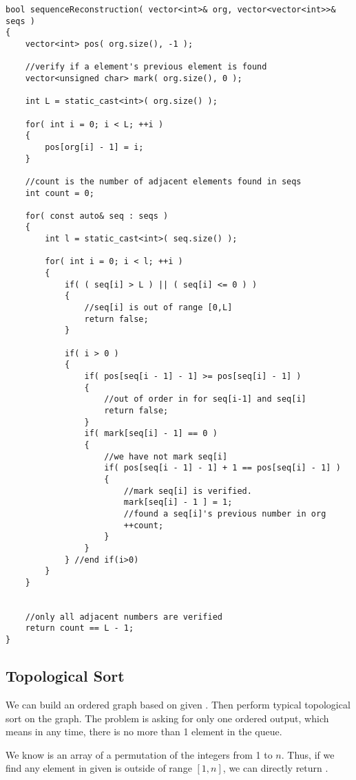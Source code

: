 \setcounter{lstlisting}{0}
\begin{lstlisting}[style=customc, caption={Verify The Position}]
bool sequenceReconstruction( vector<int>& org, vector<vector<int>>& seqs )
{
    vector<int> pos( org.size(), -1 );

    //verify if a element's previous element is found
    vector<unsigned char> mark( org.size(), 0 );

    int L = static_cast<int>( org.size() );

    for( int i = 0; i < L; ++i )
    {
        pos[org[i] - 1] = i;
    }

    //count is the number of adjacent elements found in seqs
    int count = 0;

    for( const auto& seq : seqs )
    {
        int l = static_cast<int>( seq.size() );

        for( int i = 0; i < l; ++i )
        {
            if( ( seq[i] > L ) || ( seq[i] <= 0 ) )
            {
                //seq[i] is out of range [0,L]
                return false;
            }

            if( i > 0 )
            {
                if( pos[seq[i - 1] - 1] >= pos[seq[i] - 1] )
                {
                    //out of order in for seq[i-1] and seq[i]
                    return false;
                }
                if( mark[seq[i] - 1] == 0 )
                {
                    //we have not mark seq[i]
                    if( pos[seq[i - 1] - 1] + 1 == pos[seq[i] - 1] )
                    {
                        //mark seq[i] is verified.
                        mark[seq[i] - 1 ] = 1;
                        //found a seq[i]'s previous number in org
                        ++count;
                    }
                }
            } //end if(i>0)
        }
    }


    //only all adjacent numbers are verified
    return count == L - 1;
}
\end{lstlisting}

\subsection{Topological Sort}
We can build an ordered graph based on given . Then perform typical topological sort on the graph. The problem is asking for only one ordered output, which means in any time, there is no more than 1 element in the queue. 

We know  is an array of a permutation of the integers from 1 to $n$. Thus, if we find any element in given  is outside of range $[1,n]$, we can directly return .

